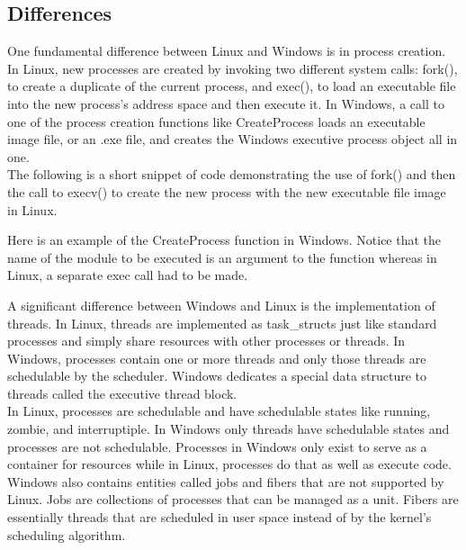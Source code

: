 \documentclass[letterpaper,10pt,titlepage]{article}
\begin{document}
\subsection{Differences}

One fundamental difference between Linux and Windows is in process creation. 
In Linux, new processes are created by invoking two different system calls:
fork(), to create a duplicate of the current process, and exec(), to load an
executable file into the new process's address space and then execute it. 
In Windows, a call to one of the process creation functions like CreateProcess
loads an executable image file, or an .exe file, and creates the Windows
executive process object all in one.
\\

The following is a short snippet of code demonstrating the use of fork() and
then the call to execv() to create the new process with the new executable
file image in Linux.



Here is an example of the CreateProcess function in Windows. Notice that the
name of the module to be executed is an argument to the function whereas in
Linux, a separate exec call had to be made.



A significant difference between Windows and Linux is the implementation of 
threads. In Linux, threads are implemented as task\_structs just like 
standard processes and simply share resources with other processes or threads.
In Windows, processes contain one or more threads and only those threads are
schedulable by the scheduler. Windows dedicates a special data structure to 
threads called the executive thread block. 
\\

In Linux, processes are schedulable and have schedulable states like running,
zombie, and interruptiple. In Windows only threads have schedulable states and
processes are not schedulable. Processes in Windows only exist to serve as a
container for resources while in Linux, processes do that as well as execute 
code.
\\

Windows also contains entities called jobs and fibers that are not supported 
by Linux. Jobs are collections of processes that can be managed as a unit.
Fibers are essentially threads that are scheduled in user space instead of
by the kernel's scheduling algorithm. 
\\
\end{document}
